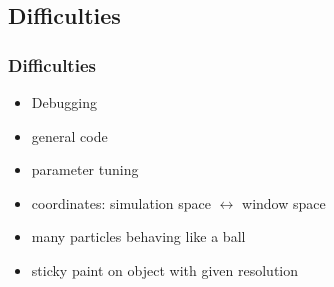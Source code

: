 \subsection{Difficulties}
\begin{frame}
	\frametitle{Difficulties}
	\begin{itemize}
		\item Debugging
		\item general code
		\item parameter tuning
		\item coordinates: simulation space $\leftrightarrow$ window space
		\item many particles behaving like a ball
		\item sticky paint on object with given resolution
	\end{itemize}
\end{frame}
